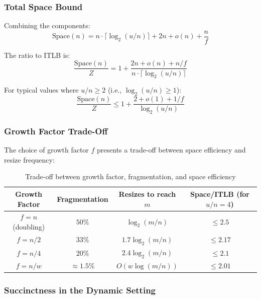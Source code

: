 \subsubsection{Total Space Bound}

Combining the components:
\begin{equation}
    \text{Space}(n) = n \cdot \lceil \log_2(u/n) \rceil + 2n + o(n) + \frac{n}{f}
\end{equation}

The ratio to ITLB is:
\begin{equation}
    \frac{\text{Space}(n)}{Z} = 1 + \frac{2n + o(n) + n/f}{n \cdot \lceil \log_2(u/n) \rceil}
\end{equation}

For typical values where $u/n \geq 2$ (i.e., $\log_2(u/n) \geq 1$):
\begin{equation}
    \frac{\text{Space}(n)}{Z} \leq 1 + \frac{2 + o(1) + 1/f}{\log_2(u/n)}
\end{equation}

\subsubsection{Growth Factor Trade-Off}

The choice of growth factor $f$ presents a trade-off between space efficiency and resize frequency:

\begin{table}[H]
\centering
\begin{tabular}{|c|c|c|c|}
\hline
\textbf{Growth Factor} & \textbf{Fragmentation} & \textbf{Resizes to reach $m$} & \textbf{Space/ITLB (for $u/n=4$)} \\
\hline
$f = n$ (doubling) & $50\%$ & $\log_2(m/n)$ & $\leq 2.5$ \\
$f = n/2$ & $33\%$ & $1.7 \log_2(m/n)$ & $\leq 2.17$ \\
$f = n/4$ & $20\%$ & $2.4 \log_2(m/n)$ & $\leq 2.1$ \\
$f = n/w$ & $\approx 1.5\%$ & $O(w \log(m/n))$ & $\leq 2.01$ \\
\hline
\end{tabular}
\caption{Trade-off between growth factor, fragmentation, and space efficiency}
\label{tab:growth-tradeoff}
\end{table}

\subsubsection{Succinctness in the Dynamic Setting}

